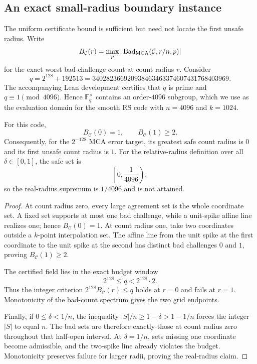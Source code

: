 \subsection{An exact small-radius boundary instance}
\label{sec:mca-boundary-field}

The uniform certificate bound is sufficient but need not locate the first
unsafe radius.  Write
\[
  B_{\mathcal C}(r)
  =
  \max_p|\operatorname{Bad}_{\operatorname{MCA}}(\mathcal C,r/n,p)|
\]
for the exact worst bad-challenge count at count radius \(r\).  Consider
\[
  q=2^{128}+192513
   =340282366920938463463374607431768403969.
\]
The accompanying Lean development certifies that \(q\) is prime and
\(q\equiv1\pmod {4096}\).  Hence \(\mathbb F_q^\times\) contains an
order-\(4096\) subgroup, which we use as the evaluation domain for the smooth
RS code with \(n=4096\) and \(k=1024\).

\begin{theorem}
\label{thm:mca-boundary-threshold}
For this code,
\[
  B_{\mathcal C}(0)=1,
  \qquad
  B_{\mathcal C}(1)\ge2.
\]
Consequently, for the \(2^{-128}\) MCA error target, its greatest safe count
radius is \(0\) and its first unsafe count radius is \(1\).
For the relative-radius definition over
all \(\delta\in[0,1]\), the safe set is
\[
  \left[0,\frac1{4096}\right),
\]
so the real-radius supremum is \(1/4096\) and is not attained.
\end{theorem}

\begin{proof}
At count radius zero, every large agreement set is the whole coordinate set.
A fixed set supports at most one bad challenge, while a unit-spike affine
line realizes one; hence \(B_{\mathcal C}(0)=1\).  At count radius one, take
two coordinates outside a \(k\)-point interpolation set.  The affine line
from the unit spike at the first coordinate to the unit spike at the second
has distinct bad challenges \(0\) and \(1\), proving
\(B_{\mathcal C}(1)\ge2\).

The certified field lies in the exact budget window
\[
  2^{128}\le q<2^{128}\cdot2.
\]
Thus the integer criterion \(2^{128}B_{\mathcal C}(r)\le q\) holds at
\(r=0\) and fails at \(r=1\).  Monotonicity of the bad-count spectrum gives
the two grid endpoints.

Finally, if \(0\le\delta<1/n\), the inequality
\(|S|/n\ge1-\delta>1-1/n\) forces the integer \(|S|\) to equal \(n\).
The bad sets are therefore exactly those at count radius zero throughout
that half-open interval.  At \(\delta=1/n\), sets missing one coordinate
become admissible, and the two-spike line already violates the budget.
Monotonicity preserves failure for larger radii, proving the real-radius
claim.
\end{proof}

